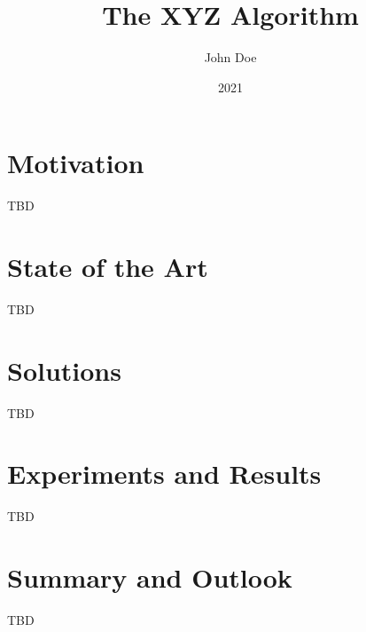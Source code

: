 \documentclass[twocolumn]{IEEEtran}
\title{The XYZ Algorithm}
\date{2021}
\author{John Doe}
\begin{document}
\maketitle

\section{Motivation}
TBD

\section{State of the Art}
TBD

\section{Solutions}
TBD


\section{Experiments and Results}
TBD

\section{Summary and Outlook}
TBD
\end{document}
